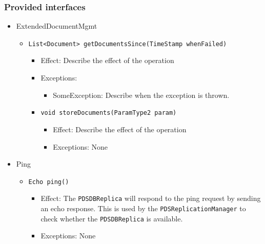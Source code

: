 \documentclass[a4paper,10pt]{article}
\begin{document}
\subsubsection*{Provided interfaces}
\begin{itemize}
    \item ExtendedDocumentMgmt
    \begin{itemize}
        \item \texttt{List<Document> getDocumentsSince(TimeStamp whenFailed)}
        \begin{itemize}
            \item Effect: Describe the effect of the operation
            \item Exceptions:
            \begin{itemize}
                \item SomeException: Describe when the exception is thrown.
            \end{itemize}
            \item \texttt{void storeDocuments(ParamType2 param)}
            \begin{itemize}
                \item Effect: Describe the effect of the operation
                \item Exceptions: None
            \end{itemize}
        \end{itemize}
    \end{itemize}

    
    \item Ping
    \begin{itemize}
        \item \texttt{Echo ping()}
        \begin{itemize}
            \item Effect: The \texttt{PDSDBReplica} will respond to the ping request by sending an echo response. This is used by the \texttt{PDSReplicationManager} to check whether the \texttt{PDSDBReplica} is available.
            \item Exceptions: None
        \end{itemize}
    \end{itemize}
\end{itemize}
\end{document}
